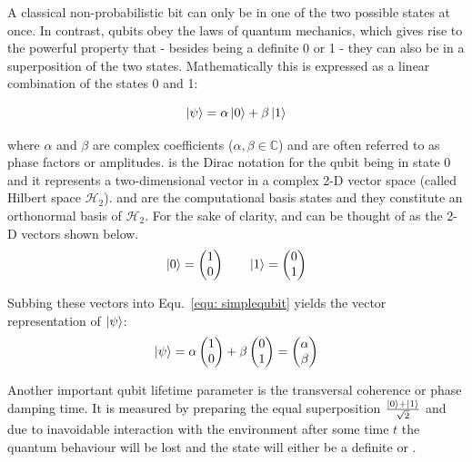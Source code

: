 
A classical non-probabilistic bit can only be in one of the two possible states at once. In contrast, qubits obey the laws of quantum mechanics, which gives rise to the powerful property that - besides being a definite 0 or 1 - they can also be in a superposition of the two states. Mathematically this is expressed as a linear combination of the states 0 and 1:

\begin{equation}
\label{equ: simplequbit}
\ket{\psi} = \alpha \ket{0} + \beta \ket{1}
\end{equation}

where $\alpha$ and $\beta$ are complex coefficients ($\alpha, \beta \in \mathbb{C}$) and are often referred to as phase factors or amplitudes. \0 is the Dirac notation for the qubit being in state 0 and it represents a two-dimensional vector in a complex 2-D vector space (called Hilbert space $\mathcal{H}_{2}$). \0 and \1 are the computational basis states and they constitute an orthonormal basis of $\mathcal{H}_{2}$. For the sake of clarity, \0 and \1 can be thought of as the 2-D vectors shown below.
\begin{equation}
\label{equ: 0and1kets}
\ket{0} =  \begin{pmatrix}1\\0\end{pmatrix} \quad \quad \ket{1} = \begin{pmatrix}0\\1\end{pmatrix}
\end{equation}

Subbing these vectors into Equ.~\ref{equ: simplequbit} yields the vector representation of $\ket{\psi}$:
\begin{equation}
\label{equ: simplequbitvector}
\ket{\psi} = \alpha \begin{pmatrix}1\\0\end{pmatrix} + \beta \begin{pmatrix}0\\1\end{pmatrix} = \begin{pmatrix}\alpha\\\beta\end{pmatrix}
\end{equation}

Another important qubit lifetime parameter is the transversal coherence or phase damping time. It is measured by preparing the equal superposition $\frac{\ket{0}+\ket{1}}{\sqrt{2}}$ and due to inavoidable interaction with the environment after some time $t$ the quantum behaviour will be lost and the state will either be a definite \0 or \1.


